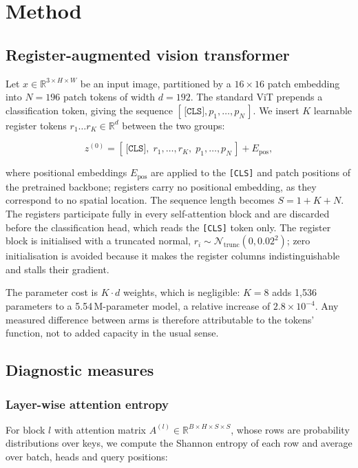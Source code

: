 \section{Method}
\label{sec:method}

\subsection{Register-augmented vision transformer}

Let $x \in \mathbb{R}^{3 \times H \times W}$ be an input image, partitioned by a
$16 \times 16$ patch embedding into $N = 196$ patch tokens of width $d = 192$.
The standard ViT prepends a classification token, giving the sequence
$[\,\texttt{[CLS]}, p_1, \dots, p_N\,]$. We insert $K$ learnable register
tokens $r_1 \dots r_K \in \mathbb{R}^{d}$ between the two groups:

\begin{equation}
z^{(0)} = [\,\texttt{[CLS]},\; r_1, \dots, r_K,\; p_1, \dots, p_N\,] + E_{\mathrm{pos}},
\end{equation}

where positional embeddings $E_{\mathrm{pos}}$ are applied to the
\texttt{[CLS]} and patch positions of the pretrained backbone; registers carry
no positional embedding, as they correspond to no spatial location. The
sequence length becomes $S = 1 + K + N$. The registers participate fully in
every self-attention block and are discarded before the classification head,
which reads the \texttt{[CLS]} token only. The register block is initialised
with a truncated normal, $r_i \sim \mathcal{N}_{\mathrm{trunc}}(0, 0.02^2)$;
zero initialisation is avoided because it makes the register columns
indistinguishable and stalls their gradient.

The parameter cost is $K \cdot d$ weights, which is negligible: $K=8$ adds
1{,}536 parameters to a 5.54\,M-parameter model, a relative increase of
$2.8 \times 10^{-4}$. Any measured difference between arms is therefore
attributable to the tokens' function, not to added capacity in the usual sense.

\subsection{Diagnostic measures}

\subsubsection{Layer-wise attention entropy}
For block $l$ with attention matrix
$A^{(l)} \in \mathbb{R}^{B \times H \times S \times S}$, whose rows are
probability distributions over keys, we compute the Shannon entropy of each row
and average over batch, heads and query positions:

